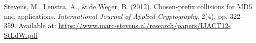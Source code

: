 \documentclass[runningheads]{llncs}
\begin{document}
\begin{thebibliography}{99}
        Stevens, M., Lenstra, A., \& de Weger, B. (2012). Chosen-prefix collisions for MD5 and applications. \textit{International Journal of Applied Cryptography}, 2(4), pp. 322--359. Available at: \url{https://www.marc-stevens.nl/research/papers/IJACT12-StLdW.pdf}

    \end{thebibliography}
\end{document}
